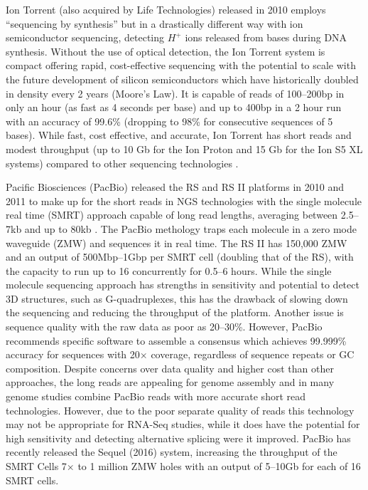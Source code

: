 \iffalse
{}

Ion Torrent (also acquired by Life Technologies) released in 2010 employs ``sequencing by synthesis'' but in a drastically different way with ion semiconductor sequencing, detecting $H^+$ ions released from bases during DNA synthesis. Without the use of optical detection, the Ion Torrent system is compact offering rapid, cost-effective sequencing with the potential to scale with the future development of silicon semiconductors which have historically doubled in density every 2 years (Moore's Law). It is capable of reads of 100--200bp in only an hour (as fast as 4 seconds per base) and up to 400bp in a 2 hour run with an accuracy of 99.6\% (dropping to 98\% for consecutive sequences of 5 bases). While fast, cost effective, and accurate, Ion Torrent has short reads and modest throughput (up to 10 Gb for the Ion Proton and 15 Gb for the Ion S5 XL systems) compared to other sequencing technologies \citep{iontorrent}.

Pacific Biosciences (PacBio) released the RS and RS II platforms in 2010 and 2011 to make up for the short reads in \gls{NGS} technologies with the single molecule real time (SMRT) approach capable of long read lengths, averaging between 2.5--7kb and up to 80kb \citet{pacbio}. The PacBio methology traps each molecule in a zero mode waveguide (ZMW) and sequences it in real time. The RS II has 150,000 ZMW and an output of 500Mbp--1Gbp per SMRT cell (doubling that of the RS), with the capacity to run up to 16 concurrently for 0.5--6 hours. While the single molecule sequencing approach has strengths in sensitivity and potential to detect 3D structures, such as G-quadruplexes, this has the drawback of slowing down the sequencing and reducing the throughput of the platform. Another issue is sequence quality with the raw data as poor as 20--30\%. However, PacBio recommends specific software to assemble a consensus which achieves 99.999\% accuracy for sequences with 20$\times$ coverage, regardless of sequence repeats or GC composition. Despite concerns over data quality and higher cost than other approaches, the long reads are appealing for genome assembly and in many genome studies combine PacBio reads with more accurate short read technologies. However, due to the poor separate quality of reads this technology may not be appropriate for \gls{RNA-Seq} studies, while it does have the potential for high sensitivity and detecting alternative splicing were it improved. PacBio has recently released the Sequel (2016) system, increasing the throughput of the SMRT Cells 7$\times$ to 1 million ZMW holes with an output of 5--10Gb for each of 16 SMRT cells. 

